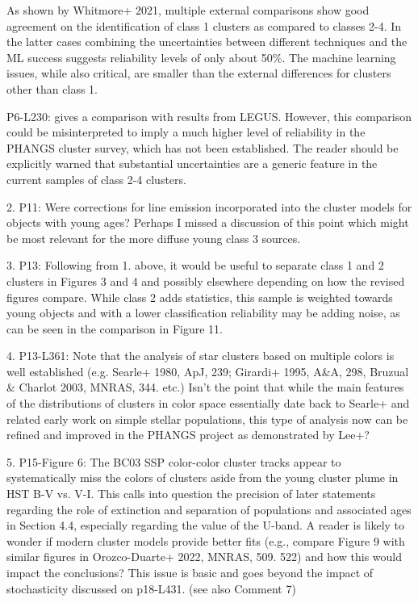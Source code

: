 As shown by Whitmore+ 2021, multiple external comparisons show good agreement on the identification of class 1 clusters as compared to classes 2-4. In the latter cases combining the uncertainties between different techniques and the ML success suggests reliability levels of only about 50\%. The machine learning issues, while also critical, are smaller than the external differences for clusters other than class 1.

P6-L230: gives a comparison with results from LEGUS. However, this comparison could be misinterpreted to imply a much higher level of reliability in the PHANGS cluster survey, which has not been established. The reader should be explicitly warned that substantial uncertainties are a generic feature in the current samples of class 2-4 clusters.

2. P11: Were corrections for line emission incorporated into the cluster models for objects with young ages? Perhaps I missed a discussion of this point which might be most relevant for the more diffuse young class 3 sources.

3. P13: Following from 1. above, it would be useful to separate class 1 and 2 clusters in Figures 3 and 4 and possibly elsewhere depending on how the revised figures compare. While class 2 adds statistics, this sample is weighted towards young objects and with a lower classification reliability may be adding noise, as can be seen in the comparison in Figure 11.

4. P13-L361: Note that the analysis of star clusters based on multiple colors is well established (e.g. Searle+ 1980, ApJ, 239; Girardi+ 1995, A\&A, 298, Bruzual \& Charlot 2003, MNRAS, 344. etc.) Isn't the point that while the main features of the distributions of clusters in color space essentially date back to Searle+ and related early work on simple stellar populations, this type of analysis now can be refined and improved in the PHANGS project as demonstrated by Lee+?

5. P15-Figure 6: The BC03 SSP color-color cluster tracks appear to systematically miss the colors of clusters aside from the young cluster plume in HST B-V vs. V-I. This calls into question the precision of later statements regarding the role of extinction and separation of populations and associated ages in Section 4.4, especially regarding the value of the U-band. A reader is likely to wonder if modern cluster models provide better fits (e.g., compare Figure 9 with similar figures in Orozco-Duarte+ 2022, MNRAS, 509. 522) and how this would impact the conclusions? This issue is basic and goes beyond the impact of stochasticity discussed on p18-L431. (see also Comment 7)

